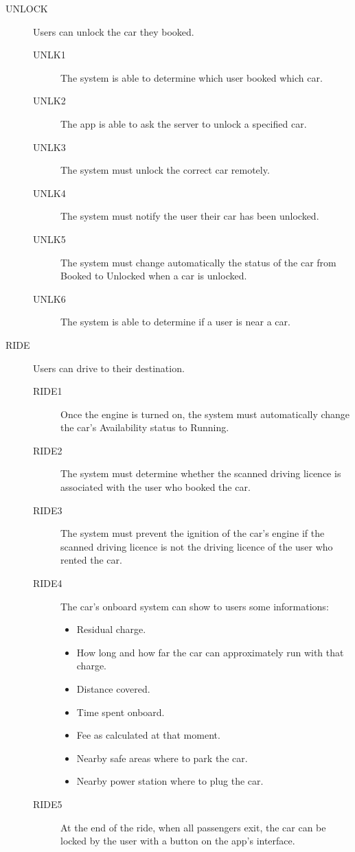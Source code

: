 \documentclass[11pt]{article} %
\begin{document}
\begin{description}
 	\item[UNLOCK] Users can unlock the car they booked.
	\begin{description}
	\item[UNLK1] The system is able to determine which user booked which car.
	\item[UNLK2] The app is able to ask the server to unlock a specified car.
	\item[UNLK3] The system must unlock the correct car remotely.
	\item[UNLK4] The system must notify the user their car has been unlocked.
	\item[UNLK5] The system must change automatically the status of the car from Booked to Unlocked when a car is unlocked.
	\item[UNLK6] The system is able to determine if a user is near a car.
	\end{description}

	\item[RIDE] Users can drive to their destination.
	\begin{description}
	\item[RIDE1] Once the engine is turned on, the system must automatically change the car's Availability status to Running.
	\item[RIDE2] The system must determine whether the scanned driving licence is associated with the user who booked the car.
	\item[RIDE3] The system must prevent the ignition of the car's engine if the scanned driving licence is not the driving licence of the user who rented the car.
	\item[RIDE4] The car's onboard system can show to users some informations:
	\begin{itemize}
		\item Residual charge.
		\item How long and how far the car can approximately run with that charge.
		\item Distance covered.
		\item Time spent onboard.
		\item Fee as calculated at that moment.
		\item Nearby safe areas where to park the car.
		\item Nearby power station where to plug the car.
	\end{itemize}
	\item[RIDE5] At the end of the ride, when all passengers exit, the car can be locked by the user with a button on the app's interface.
 	\end{description}


\end{description}
\end{document}
